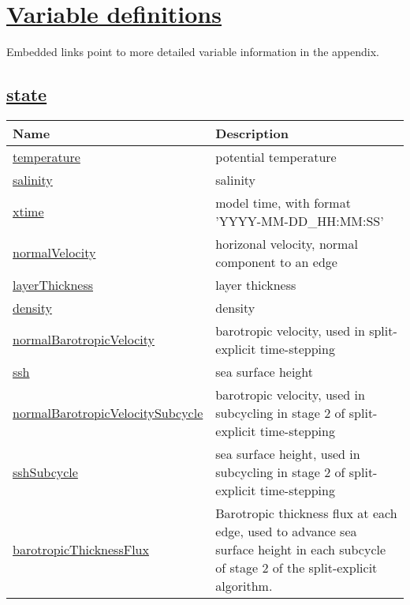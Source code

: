 \chapter[Variable definitions]{\hyperref[chap:variable_sections]{Variable definitions}}
\label{chap:variable_tables}
Embedded links point to more detailed variable information in the appendix.
\section[state]{\hyperref[sec:var_sec_state]{state}}
\label{sec:var_tab_state}
{\small
\begin{center}
\begin{longtable}{| p{2.0in} | p{4.0in} |}
	\hline
	{\bf Name} & {\bf Description} \\
	\hline
	\hyperref[subsec:var_sec_state_temperature]{temperature} & potential temperature \\
	\hline
	\hyperref[subsec:var_sec_state_salinity]{salinity} & salinity \\
	\hline
	\hyperref[subsec:var_sec_state_xtime]{xtime} & model time, with format 'YYYY-MM-DD\_HH:MM:SS' \\
	\hline
	\hyperref[subsec:var_sec_state_normalVelocity]{normalVelocity} & horizonal velocity, normal component to an edge \\
	\hline
	\hyperref[subsec:var_sec_state_layerThickness]{layerThickness} & layer thickness \\
	\hline
	\hyperref[subsec:var_sec_state_density]{density} & density \\
	\hline
	\hyperref[subsec:var_sec_state_normalBarotropicVelocity]{normalBarotropicVelocity} & barotropic velocity, used in split-explicit time-stepping \\
	\hline
	\hyperref[subsec:var_sec_state_ssh]{ssh} & sea surface height \\
	\hline
	\hyperref[subsec:var_sec_state_normalBarotropicVelocitySubcycle]{normalBarotropicVelocitySubcycle} & barotropic velocity, used in subcycling in stage 2 of split-explicit time-stepping \\
	\hline
	\hyperref[subsec:var_sec_state_sshSubcycle]{sshSubcycle} & sea surface height, used in subcycling in stage 2 of split-explicit time-stepping \\
	\hline
	\hyperref[subsec:var_sec_state_barotropicThicknessFlux]{barotropicThicknessFlux} & Barotropic thickness flux at each edge, used to advance sea surface height in each subcycle of stage 2 of the split-explicit algorithm. \\

\end{longtable}
\end{center}}
